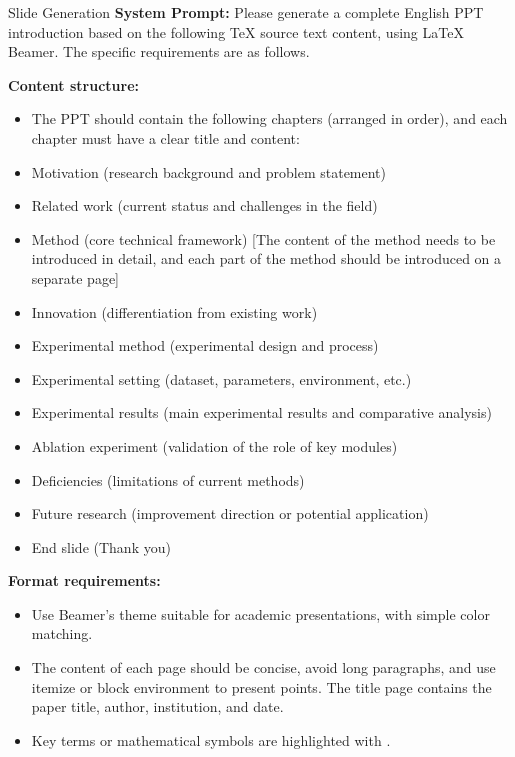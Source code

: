 \begin{promptbox}{Slide Generation}
\textbf{System Prompt:} Please generate a complete English PPT introduction based on the following TeX source text content, using LaTeX Beamer. The specific requirements are as follows.

\medskip
\textbf{Content structure:}
\begin{itemize}[leftmargin=1.2em,itemsep=2pt,topsep=2pt]
  \item The PPT should contain the following chapters (arranged in order), and each chapter must have a clear title and content:
  \item Motivation (research background and problem statement)
  \item Related work (current status and challenges in the field)
  \item Method (core technical framework) [The content of the method needs to be introduced in detail, and each part of the method should be introduced on a separate page]
  \item Innovation (differentiation from existing work)
  \item Experimental method (experimental design and process)
  \item Experimental setting (dataset, parameters, environment, etc.)
  \item Experimental results (main experimental results and comparative analysis)
  \item Ablation experiment (validation of the role of key modules)
  \item Deficiencies (limitations of current methods)
  \item Future research (improvement direction or potential application)
  \item End slide (Thank you)
\end{itemize}

\textbf{Format requirements:}
\begin{itemize}[leftmargin=1.2em,itemsep=2pt,topsep=2pt]
\item Use Beamer's theme suitable for academic presentations, with simple color matching.
\item The content of each page should be concise, avoid long paragraphs, and use itemize or block environment to present points.
The title page contains the paper title, author, institution, and date.
\item Key terms or mathematical symbols are highlighted with \text{\\alert\{\}}.
\end{itemize}


\end{promptbox}
